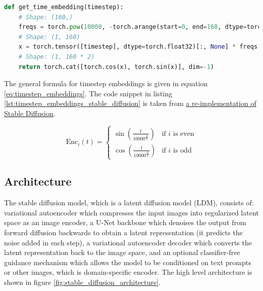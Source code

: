 \begin{lstlisting}[language=Python, breaklines=true, caption={Timestep embeddings of Stable Diffusion pipeline. We convert the timestep to sinusoidal vector embedding.}, label={lst:timestep_embeddings_stable_diffusion}]
def get_time_embedding(timestep):
    # Shape: (160,)
    freqs = torch.pow(10000, -torch.arange(start=0, end=160, dtype=torch.float32) / 160) 
    # Shape: (1, 160)
    x = torch.tensor([timestep], dtype=torch.float32)[:, None] * freqs[None]
    # Shape: (1, 160 * 2)
    return torch.cat([torch.cos(x), torch.sin(x)], dim=-1)
\end{lstlisting}

The general formula for timestep embeddings is given in equation \ref{eq:timestep_embeddings}. The code snippet in listing \ref{lst:timestep_embeddings_stable_diffusion} is taken from \href{https://github.com/hkproj/pytorch-stable-diffusion/blob/e0cb06de011787cdf13eed7b4287ad8410491149/sd/pipeline.py#L164}{a re-implementation of Stable Diffusion}.

\begin{equation}
    \text{Enc}_i(t) =
    \begin{cases}
        \sin\left(\frac{t}{10000^{\frac{2i}{d}}}\right) & \text{if } i \text{ is even} \\
        \cos\left(\frac{t}{10000^{\frac{2i}{d}}}\right) & \text{if } i \text{ is odd}
    \end{cases}
    \label{eq:timestep_embeddings}
\end{equation}








\subsection{Architecture}

The stable diffusion model, which is a latent diffusion model (LDM), consists of: variational autoencoder which compresses the input images into regularized latent space as an image encoder, a U-Net backbone which denoises the output from forward diffusion backwards to obtain a latent representation (it predicts the noise added in each step), a variational autoencoder decoder which converts the latent representation back to the image space, and an optional classifier-free guidance mechanism which allows the model to be conditioned on text prompts or other images, which is domain-specific encoder. The high level architecture is shown in figure \ref{fig:stable_diffusion_architecture}.

